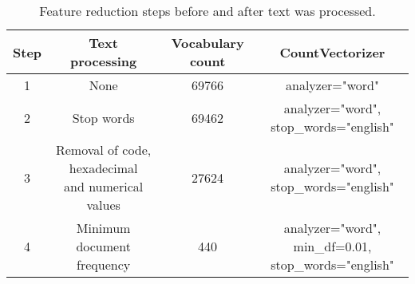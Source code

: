 \begin{table}[tbp]
	\centering
	\begin{tabular}{| c | c | c | c |}
		\hline
		Step & Text processing  & Vocabulary count & CountVectorizer  \\ \hline
		1 	& None 									& 69766 	& analyzer="word" \\ \hline
		2 	& Stop words 							& 69462 	& 
			\shortstack{analyzer="word", \\ stop\_words="english"} \\ \hline
		3 	& \shortstack{Removal of code, 
			hexadecimal \\ and numerical values} 	& 27624 	& 
			\shortstack{analyzer="word", \\ stop\_words="english"} \\ \hline
		4 	& Minimum document frequency 			& 440 		& 
				\shortstack{analyzer="word", min\_df=0.01, \\ stop\_words="english"} \\ \hline
	\end{tabular}
	\caption{Feature reduction steps before and after text was processed.}
	\label{tab:feature_reduction}
\end{table}


